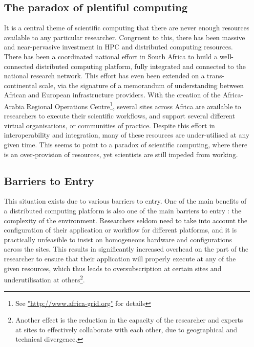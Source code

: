 \documentclass[a4paper]{jpconf}
\begin{document}

	\subsection{The paradox of  plentiful computing}

    It is a central theme of scientific computing that there are never enough resources available to
    any particular researcher. Congruent to this, there has
    been massive and near-pervasive investment in HPC and distributed computing resources. There has
    been a coordinated national effort in South Africa to build a well-connected distributed computing
    platform\cite{SAGrid}, fully integrated and connected to the national research
    network\cite{SANREN}. This effort has even been extended on a trans-continental scale, via the
    signature of a memorandum of understanding between African and European infrastructure
    providers\cite{AAROC}. With the creation of the Africa-Arabia Regional Operations
    Centre\footnote{See \url{"http://www.africa-grid.org"} for details}, several sites across Africa
    are available to researchers to execute their scientific workflows, and support several
    different virtual organisations, or communities of practice. Despite this effort in
    interoperability and integration, many of these resources are under-utilised at any given time.
    This seems to point to a paradox of scientific computing, where there is an over-provision of
    resources, yet scientists are still impeded from working.

	\subsection{Barriers to Entry}

    This situation exists due to various barriers to entry. One of the main benefits of a distributed computing
    platform is also one of the main barriers to entry : the complexity of the environment.
    Researchers seldom need to take into account the configuration of their application or workflow
    for different platforms, and it is practically unfeasible to insist on homogeneous hardware and
    configurations across the sites. This results in significantly increased overhead on the part of
    the researcher to ensure that their application will properly execute at any of the given
    resources, which thus leads to oversubscription at certain sites and underutilisation at
    others\footnote{Another effect is the reduction in the capacity of the researcher and experts at
    sites to effectively collaborate with each other, due to geographical and technical
    divergence.}.
\end{document}
